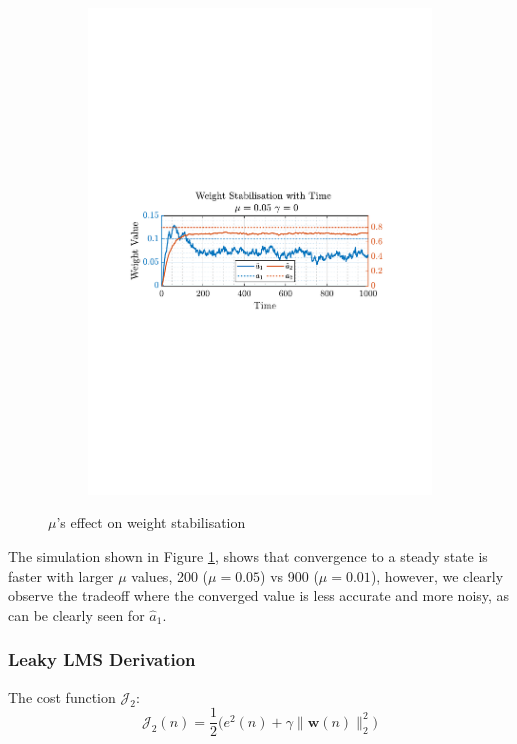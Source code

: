 \documentclass[12pt]{article}
\numberwithin{equation}{section}
\def\vw{{\bm{w}}}
\begin{document}
\begin{figure}[H]
\begin{subfigure}{0.49\textwidth}
					\includegraphics[trim={2.2cm 11.2cm 3.00cm  11.2cm}, clip, width
					=\textwidth]{../MATLAB/figures/q2_1cd_fig03.pdf} 
					\captionsetup{justification=centering}
				\end{subfigure}
				\captionsetup{justification=centering}
				\caption{$\mu$'s effect on weight stabilisation}
				\label{fig: 2-1d}
			\end{figure}
		The simulation shown in Figure \ref{fig: 2-1d}, shows that convergence to a steady state is faster with larger $\mu$ values, 200 ($\mu=0.05$) vs 900 ($\mu=0.01$), however, we clearly observe the tradeoff where the converged value is less accurate and more noisy, as can be clearly seen for $\hat{a}_1$.
		\subsubsection{Leaky LMS Derivation}
			The cost function $\mathcal{J}_{2}$:
			\vspace*{-0.6\baselineskip}
			\begin{equation}
			\mathcal{J}_{2}(n) = \frac{1}{2} \bigg( e^{2}(n) + \gamma \| \vw(n) \|_{2}^{2} \bigg)
			\label{eq: 2-1e-J_2}
			\end{equation}
			
\end{document}
